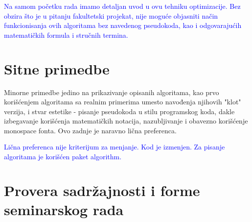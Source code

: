 \documentclass[a4paper]{report}
\newcommand{\odgovor}[1]{\textcolor{blue}{#1}}
\begin{document}
\odgovor{Na samom početku rada imamo detaljan uvod u ovu tehniku optimizacije. Bez obzira što je u pitanju fakultetski projekat, nije moguće objasniti način funkcionisanja ovih algoritama bez navedenog pseudokoda, kao i odgovarajućih matematičkih formula i stručnih termina.}

\section{Sitne primedbe}
Minorne primedbe jedino na prikazivanje opisanih algoritama, kao prvo korišćenjem algoritama sa realnim primerima umesto navođenja njihovih "klot" verzija, 
i stvar estetike - pisanje pseudokoda u stilu programskog koda, dakle izbegavanje korišćenja matematičkih notacija, nazubljivanje i obavezno korišćenje 
monospace fonta. Ovo zadnje je naravno lična preferenca.

\odgovor{Lična preferenca nije kriterijum za menjanje. Kod je izmenjen. Za pisanje algoritama je korišćen paket algorithm.}

\section{Provera sadržajnosti i forme seminarskog rada}
\end{document}
